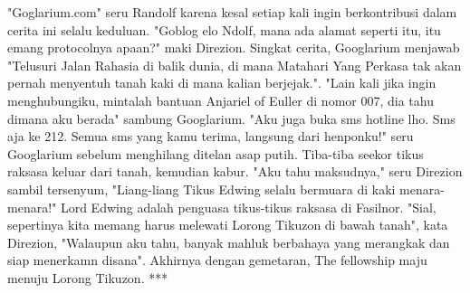 \documentclass[a4paper,11pt,final]{article}
\begin{document}
"Goglarium.com" seru Randolf karena kesal setiap kali ingin berkontribusi dalam cerita ini selalu keduluan.
"Goblog elo Ndolf, mana ada alamat seperti itu, itu emang protocolnya apaan?" maki Direzion.
Singkat cerita, Googlarium menjawab "Telusuri Jalan Rahasia di balik dunia, di mana Matahari Yang Perkasa tak akan pernah menyentuh tanah kaki di mana kalian berjejak.".
"Lain kali jika ingin menghubungiku, mintalah bantuan Anjariel of Euller di nomor 007, dia tahu dimana aku berada" sambung Googlarium.
"Aku juga buka sms hotline lho. Sms aja ke 212. Semua sms yang kamu terima, langsung dari henponku!" seru Googlarium sebelum menghilang ditelan asap putih.
Tiba-tiba seekor tikus raksasa keluar dari tanah, kemudian kabur. "Aku tahu maksudnya," seru Direzion sambil tersenyum, "Liang-liang Tikus Edwing selalu bermuara di kaki menara-menara!" Lord Edwing adalah penguasa tikus-tikus raksasa di Fasilnor.
"Sial, sepertinya kita memang harus melewati Lorong Tikuzon di bawah tanah", kata Direzion, "Walaupun aku tahu, banyak mahluk berbahaya yang merangkak dan siap menerkamn disana". Akhirnya dengan gemetaran, The fellowship maju menuju Lorong Tikuzon.
***
\end{document}
